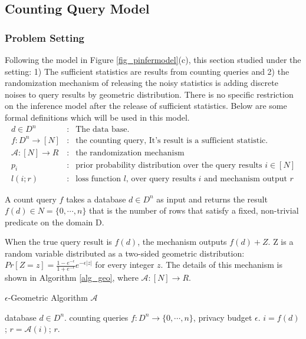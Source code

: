 \documentclass{article}
\begin{document}
\subsection{Counting Query Model \texorpdfstring{\cite{ghosh2012universally}}{}}
%

\subsubsection{Problem Setting}
%
Following the model in Figure \ref{fig_pinfermodel}(c), this section studied under the setting: 
1) The sufficient statistics are results from counting queries and 
2) the randomization mechanism of releasing the noisy statistics
is adding discrete noises to query results by geometric distribution. 
There is no specific restriction on the inference model after the release of sufficient statistics.
%
Below are some formal definitions which will be used in this model.
%
%
%
\[
\begin{array}{lcl}
	d \in D^n 
	& : &
	\mbox{The data base}.\\
	f : D^n \rightarrow [N]
	& : & \mbox{the counting query, It's result is a sufficient statistic.}\\
	\mathcal{A}: [N] \rightarrow R
	& : & \mbox{the randomization mechanism}\\
	p_i
	& : & \mbox{prior probability distribution over the query results } i \in [N]\\
	l(i; r)
	& : & \mbox{loss function $l$, over query results $i$ and mechanism output $r$}
\end{array}
\]
%
%
\begin{defn}
A count query $f$ takes a database $d \in D^n$ as input and returns the result $f(d) \in N = \{0, \cdots ,n\}$ that is the number of rows that satisfy a fixed, non-trivial predicate on the domain D.
\end{defn}
%
\begin{defn}
When the true query result is $f(d)$, the mechanism outputs $f(d)+Z$. Z is a random variable distributed as a two-sided geometric distribution: 
$Pr[Z = z] = \frac{1 - e^{-\epsilon}}{1 + e^{-\epsilon}} e^{-\epsilon|z|}$
for every integer $z$. The details of this mechanism is shown in Algorithm \ref{alg_geo}, where $\mathcal{A}: [N] \rightarrow R $.
%
\begin{algorithm}
\caption{$\epsilon$-Geometric Algorithm $\mathcal{A}$}
\label{alg_geo}
\begin{algorithmic}
\REQUIRE database $d \in D^n$.
 counting queries $f : D^n \rightarrow \{0, \cdots ,n\}$,  privacy budget $\epsilon$.
 $i = f(d)$; 
 $r = \mathcal{A}(i)$; 
\STATE  {}
\RETURN $r$.
\end{algorithmic}
\end{algorithm} 
%
\end{defn}
\end{document}
